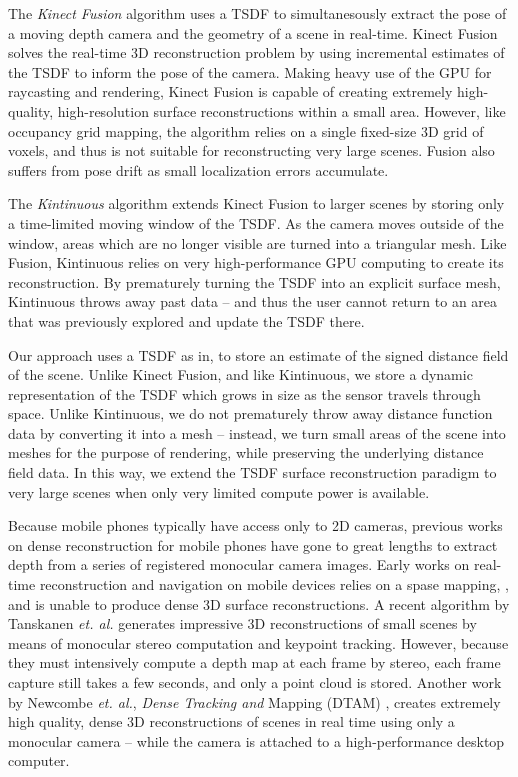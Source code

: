 The \emph{Kinect Fusion} \cite{Newcombe} algorithm uses a TSDF to
simultanesously extract the pose of a moving depth camera and the geometry of a
scene in real-time. Kinect Fusion solves the real-time 3D reconstruction problem
by using incremental estimates of the TSDF to inform the pose of the camera.
Making heavy use of the GPU for raycasting and rendering, Kinect Fusion is
capable of creating extremely high-quality, high-resolution surface 
reconstructions within a small area. However, like occupancy grid mapping, the
algorithm relies on a single fixed-size 3D grid of voxels, and thus is not
suitable for reconstructing very large scenes. Fusion also suffers from pose
drift as small localization errors accumulate.

The \emph{Kintinuous} \cite{Whelan2013} algorithm extends Kinect Fusion to
larger scenes by storing only a time-limited moving window of the TSDF. As the camera
moves outside of the window, areas which are no longer visible are turned into a
triangular mesh. Like Fusion, Kintinuous relies on very high-performance GPU
computing to create its reconstruction.  By prematurely turning the TSDF into an
explicit surface mesh, Kintinuous throws away past data -- and thus the user
cannot return to an area that was previously explored and update the TSDF there.

Our approach uses a TSDF as in\cite{Curless1996,Newcombe,Whelan2013,Bylow2013},
to store an estimate of the signed distance field of the scene. Unlike Kinect
Fusion, and like Kintinuous, we store a dynamic representation of the TSDF
which grows in size as the sensor travels through space. Unlike Kintinuous, we
do not prematurely throw away distance function data by converting it into a
mesh -- instead, we turn small areas of the scene into meshes for the purpose
of rendering, while preserving the underlying distance field data. In this way,
we extend the TSDF surface reconstruction paradigm to very large scenes when only
very limited compute power is available.

Because mobile phones typically have access only to 2D cameras, previous works
on dense reconstruction for mobile phones have gone to great lengths to extract
depth from a series of registered monocular camera images.  Early works on
real-time reconstruction and navigation on mobile devices relies on a spase
mapping, \cite{KleinSparse}, and is unable to produce dense 3D surface
reconstructions.  A recent algorithm by Tanskanen \emph{et. al.}
\cite{TanskanenMetric} generates impressive 3D reconstructions of small scenes
by means of monocular stereo computation and keypoint tracking. However,
because they \cite{TanskanenMetric} must intensively compute a depth map at
each frame by stereo, each frame capture still takes a few seconds, and only a
point cloud is stored. Another work by Newcombe \emph{et. al.}, \textit{Dense
Tracking and} Mapping (DTAM) \cite{DTAM},  creates extremely high quality,
dense 3D reconstructions of scenes in real time using only a monocular camera
-- while the camera is attached to a high-performance desktop computer. 


